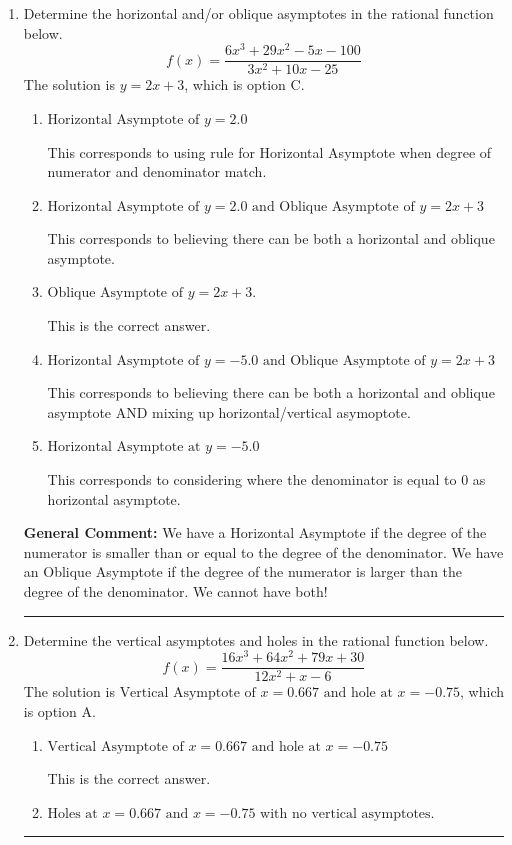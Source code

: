 \documentclass{extbook}[14pt]
\newcommand{\litem}[1]{\item #1

\rule{\textwidth}{0.4pt}}
\begin{document}
\begin{enumerate}\litem{
Determine the horizontal and/or oblique asymptotes in the rational function below.
\[ f(x) = \frac{6x^{3} +29 x^{2} -5 x -100}{3x^{2} +10 x -25} \]The solution is \( y = 2x + 3 \), which is option C.\begin{enumerate}[label=\Alph*.]
\item \( \text{Horizontal Asymptote of } y = 2.0  \)

This corresponds to using rule for Horizontal Asymptote when degree of numerator and denominator match.
\item \( \text{Horizontal Asymptote of } y = 2.0 \text{ and Oblique Asymptote of } y = 2x + 3 \)

This corresponds to believing there can be both a horizontal and oblique asymptote.
\item \( \text{Oblique Asymptote of } y = 2x + 3. \)

This is the correct answer.
\item \( \text{Horizontal Asymptote of } y = -5.0 \text{ and Oblique Asymptote of } y = 2x + 3 \)

This corresponds to believing there can be both a horizontal and oblique asymptote AND mixing up horizontal/vertical asymoptote.
\item \( \text{Horizontal Asymptote at } y = -5.0 \)

This corresponds to considering where the denominator is equal to 0 as horizontal asymptote.
\end{enumerate}

\textbf{General Comment:} We have a Horizontal Asymptote if the degree of the numerator is smaller than or equal to the degree of the denominator. We have an Oblique Asymptote if the degree of the numerator is larger than the degree of the denominator. We cannot have both!
}
\litem{
Determine the vertical asymptotes and holes in the rational function below.
\[ f(x) = \frac{16x^{3} +64 x^{2} +79 x + 30}{12x^{2} +x -6} \]The solution is \( \text{Vertical Asymptote of } x = 0.667 \text{ and hole at } x = -0.75 \), which is option A.\begin{enumerate}[label=\Alph*.]
\item \( \text{Vertical Asymptote of } x = 0.667 \text{ and hole at } x = -0.75 \)

This is the correct answer.
\item \( \text{Holes at } x = 0.667 \text{ and } x = -0.75 \text{ with no vertical asymptotes.} \)


\end{enumerate}}
\end{enumerate}
\end{document}

